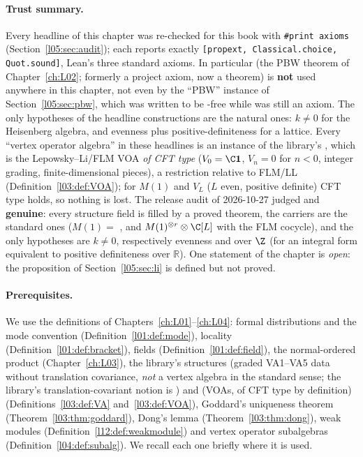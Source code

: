 \paragraph{Trust summary.} Every headline of this chapter was re-checked for this book with
\texttt{\#print axioms} (Section~\ref{l05:sec:audit}); each reports exactly
\texttt{[propext, Classical.choice, Quot.sound]}, Lean's three standard axioms. In particular
 (the PBW theorem of Chapter~\ref{ch:L02}; formerly a project axiom, now a theorem) is
\textbf{not} used anywhere in this chapter, not even by the ``PBW'' instance of Section~\ref{l05:sec:pbw}, which was
written to be -free while  was still an axiom. The only hypotheses of the headline constructions are the natural ones: $k\neq0$ for
the Heisenberg algebra, and evenness plus positive-definiteness for a lattice. Every ``vertex operator algebra'' in
these headlines is an instance of the library's , which is the Lepowsky--Li/FLM VOA
\emph{of CFT type} ($V_0 = \C\lfivevac$, $V_n = 0$ for $n<0$, integer grading, finite-dimensional pieces), a restriction
relative to FLM/LL (Definition~\ref{l03:def:VOA}); for $M(1)$ and $V_L$ ($L$ even, positive definite) CFT type holds, so
nothing is lost. The release audit of 2026-10-27 judged  and 
\textbf{genuine}: every structure field is filled by a proved theorem, the carriers are the standard ones
($M(1) = $ , and $M(1)^{\otimes r}\otimes\C[L]$ with the FLM cocycle), and the only hypotheses
are $k\neq0$, respectively evenness and  over $\Z$ (for an integral form equivalent to positive
definiteness over $\mathbb{R}$). One statement of the
chapter is \emph{open}: the proposition  of Section~\ref{l05:sec:li} is defined but
not proved.

\paragraph{Prerequisites.} We use the definitions of Chapters~\ref{ch:L01}--\ref{ch:L04}: formal distributions and
the mode convention  (Definition~\ref{l01:def:mode}), locality
(Definition~\ref{l01:def:bracket}), fields (Definition~\ref{l01:def:field}), the normal-ordered product
 (Chapter~\ref{ch:L03}), the library's structures  (graded VA1--VA5 data without
translation covariance, \emph{not} a vertex algebra in the standard sense; the library's translation-covariant notion
is ) and  (VOAs, of CFT type by definition) (Definitions~\ref{l03:def:VA} and~\ref{l03:def:VOA}), Goddard's uniqueness theorem
(Theorem~\ref{l03:thm:goddard}), Dong's lemma (Theorem~\ref{l03:thm:dong}), weak modules
(Definition~\ref{l12:def:weakmodule}) and vertex operator subalgebras
(Definition~\ref{l04:def:subalg}). We recall each one briefly where it is used.

